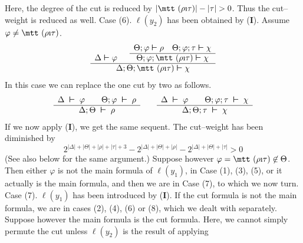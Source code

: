 Here, the degree of the cut is reduced by $|\mbox{\mtt ($\rho$\symbol{25}%
$\tau$)}| - |\tau| > 0$. Thus the cut--weight is reduced as well. 
Case (6). $\ell(y_2)$ has been obtained by ({\mtt{}}\textbf{I}).
Assume $\varphi \neq \mbox{\mtt ($\rho$\symbol{25}$\tau$)}$.
\begin{equation}
\begin{array}{r@{\;\bvdash\;}l@{\quad}ccc}
\multicolumn{2}{c}{} & & \Theta;\varphi \bvdash \rho &
    \Theta;\varphi;\tau \bvdash \chi \\\cline{4-5}
\Delta & \varphi & &
    \multicolumn{2}{c}{\Theta;\varphi;\mbox{\mtt ($\rho$\symbol{25}$\tau$)} 
	\bvdash \chi}
\\\hline
\multicolumn{5}{c}{\Delta;\Theta;\mbox{\mtt ($\rho$\symbol{25}$\tau$)}
    \bvdash \chi}
\end{array}
\end{equation}
In this case we can replace the one cut by two as follows. 
\begin{equation}
\begin{array}{c}
\Delta\;\boldsymbol{\vdash}\; \varphi \qquad \Theta;\varphi\;\boldsymbol{\vdash}\; \rho 
\\\hline
\Delta;\Theta\;\boldsymbol{\vdash}\;\rho
\end{array}
\qquad
\begin{array}{c}
\Delta\;\boldsymbol{\vdash}\; \varphi \qquad \Theta;\varphi;\tau\;\boldsymbol{\vdash}\; \chi
\\\hline
\Delta;\Theta;\tau\;\boldsymbol{\vdash}\;\chi
\end{array}
\end{equation}
If we now apply ({\mtt{}}\textbf{I}), we get the same sequent. 
The cut--weight has been diminished by
\begin{equation}
2^{|\Delta| + |\Theta| + |\rho| + |\tau| + 3} - 
2^{|\Delta| + |\Theta| + |\rho|} - 
2^{|\Delta| + |\Theta| + |\tau|} > 0
\end{equation}
(See also below for the same argument.) Suppose however 
$\varphi = \mbox{\mtt ($\rho$\symbol{25}$\tau$)} \not\in \Theta$. 
Then either $\varphi$ is not the main formula of $\ell(y_1)$, 
in Case (1), (3), (5), or it actually is the main formula, and 
then we are in Case (7), to which we now turn.
Case (7). $\ell(y_1)$ has been introduced by (\textbf{I}{\mtt{}}). 
If the cut formula is not the main formula, we are in cases 
(2), (4), (6) or (8), which we dealt with separately. Suppose 
however the main formula is the cut formula. Here, we cannot 
simply permute the cut unless $\ell(y_2)$ is the result of applying 
